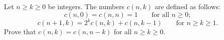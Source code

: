 Let $n \geq k \geq 0$ be integers. The numbers $c(n,k)$ are defined as follows:
\[ c(n,0) = c(n,n) = 1 \qquad \text{for all } n \geq 0; \]
\[ c(n+1,k) = 2^k c(n,k) + c(n,k-1) \qquad \text{for } n \geq k \geq 1. \]
Prove that $c(n,k) = c(n,n-k)$ for all $n \geq k \geq 0$.
